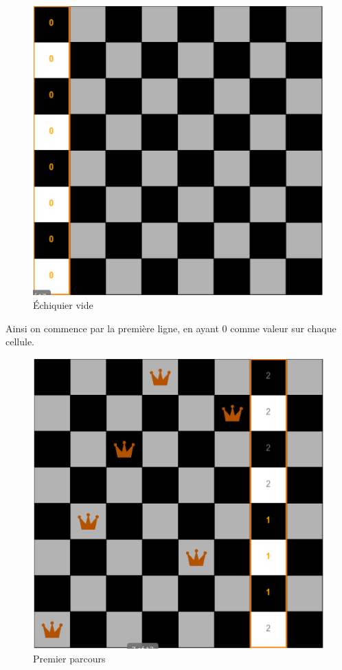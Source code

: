 \documentclass{article}
\begin{document}
\begin{figure}[!h]
	\caption{\label{local1} Échiquier vide}
	\begin{center}
	\includegraphics[scale=0.3]{./picture/local1.png}
	\end{center}
\end{figure}

Ainsi on commence par la première ligne, en ayant 0 comme valeur sur chaque cellule. 

\begin{figure}[!h]
	\caption{\label{local2} Premier parcours}
	\begin{center}
	\includegraphics[scale=0.3]{./picture/local2.png}
	\end{center}
\end{figure}
\end{document}
